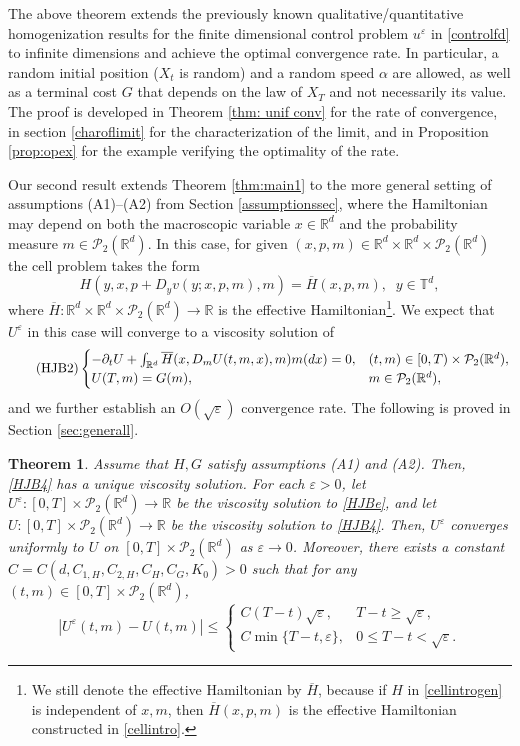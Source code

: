 \documentclass[reqno,11pt]{amsart}
\newtheorem{theorem}{Theorem}[section]
\numberwithin{equation}{section}
\newcommand{\be}{\begin{equation}}
\newcommand{\ee}{\end{equation}}
\newcommand{\R}{\mathbb{R}} %
\newcommand{\e}{\varepsilon}
\newcommand{\ep}{\varepsilon}
\newcommand{\T}{\mathbb{T}}
\newcommand{\nd}{\noindent}
\renewcommand{\bar}{\overline}
\begin{document}
\nd
The above theorem extends the previously known qualitative/quantitative homogenization results for the finite dimensional control problem $u^\e$ in \eqref{controlfd} to infinite dimensions and achieve the optimal convergence rate. In particular, a random initial position ($X_t$ is random) and a random speed $\alpha$ are allowed, as well as a terminal cost $G$ that depends on the law of $X_T$ and not necessarily its value. The proof is developed in Theorem \ref{thm: unif conv} for the rate of convergence, in section \ref{charoflimit} for the characterization of the limit, and in Proposition \ref{prop:opex} for the example verifying the optimality of the rate.

\vspace{2mm}

    \nd
    Our second result extends Theorem \ref{thm:main1} to the more general setting of assumptions (A1)–(A2) from Section \ref{assumptionssec}, where the Hamiltonian may depend on both the macroscopic variable $x\in \R^d$ and the probability measure $m\in \mathcal{P}_2(\R^d)$. In this case, for given $(x,p,m)\in \R^d\times\R^d\times \mathcal{P}_2(\R^d)$ the cell problem takes the form
    \be\label{cellintrogen}
        H(y,x,p+D_y v(y;x,p,m),m)=\overline{H}(x,p,m),\;\;y\in\T^d,
    \ee
    where $\overline{H}\colon \R^d\times\R^d\times\mathcal{P}_2(\R^d)\to \R$ is the effective Hamiltonian\footnote{We still denote the effective Hamiltonian by $\overline{H}$, because if $H$ in \eqref{cellintrogen} is independent of $x,m$, then $\overline{H}(x,p,m)$ is the effective Hamiltonian constructed in \eqref{cellintro}.}. We expect that $U^\e$ in this case will converge to a viscosity solution of
    \be\label{HJB4}\tag{$\mathrm{HJB2}$}
\begin{cases}
    -\partial_tU+\int_{\R^d}\bar{H}(x, D_mU(t,m,x),m)m(dx)=0, &(t,m)\in [0,T)\times \mathcal{P}_2(\R^d),\\
    U(T,m)= G(m), & m\in\mathcal{P}_2(\R^d),
\end{cases}
\ee
    and we further establish an $O(\sqrt{\e})$ convergence rate. The following is proved in Section \ref{sec:generall}.

\begin{theorem}\label{thm:multiscale}
Assume that $H,G$ satisfy assumptions (A1) and (A2). Then, \eqref{HJB4} has a unique viscosity solution. For each $\varepsilon>0$, let $U^\varepsilon \colon [0,T]\times\mathcal{P}_2(\R^d) \to \mathbb{R}$ be the viscosity solution to \eqref{HJBe}, and let $U\colon [0,T]\times\mathcal{P}_2(\R^d) \to \mathbb{R}$ be the viscosity solution to \eqref{HJB4}. Then, $U^\ep$ converges uniformly to $U$ on $[0,T]\times \mathcal{P}_2(\R^d)$ as $\ep\to 0$. Moreover, there exists a constant $C=C\left(d, C_{1, H}, C_{2,H}, C_H, C_G, K_0\right)>0$ such that for any $(t, m)\in [0,T] \times \mathcal{P}_2(\R^d)$,
\[
\left|U^\varepsilon(t,m)-U(t,m)\right| \le
\begin{cases}
C(T-t)\sqrt{\varepsilon}, & T-t \ge \sqrt{\varepsilon},\\[4pt]
C\min\{T-t,\varepsilon\}, & 0\leq T-t<\sqrt{\varepsilon}.
\end{cases}
\]
\end{theorem}
\vspace{2mm}
\end{document}
